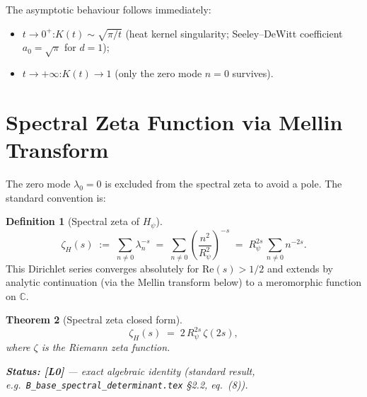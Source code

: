 \documentclass[11pt,a4paper]{article}
\newtheorem{theorem}{Theorem}[section]
\theoremstyle{definition}
\newtheorem{definition}[theorem]{Definition}
\theoremstyle{remark}
\newcommand{\Rp}{R_{\psi}}
\newcommand{\ZH}{\zeta_{H}(s)}
\newcommand{\Hp}{H_{\psi}}
\begin{document}
\medskip
The asymptotic behaviour follows immediately:
\begin{itemize}
  \item $t \to 0^+$:\quad $K(t) \sim \sqrt{\pi/t}$ (heat kernel singularity;
        Seeley--DeWitt coefficient $a_0 = \sqrt{\pi}$ for $d=1$);
  \item $t \to +\infty$:\quad $K(t) \to 1$ (only the zero mode $n=0$
        survives).
\end{itemize}

\section{Spectral Zeta Function via Mellin Transform}
\label{sec:mellin}

The zero mode $\lambda_0 = 0$ is excluded from the spectral zeta to
avoid a pole.  The standard convention is:

\begin{definition}[Spectral zeta of $\Hp$]\label{def:spec-zeta}
\begin{equation}\label{eq:spec-zeta-def}
  \ZH \;:=\; \sum_{n \neq 0} \lambda_n^{-s}
          \;=\; \sum_{n \neq 0} \left(\frac{n^2}{\Rp^2}\right)^{-s}
          \;=\; \Rp^{2s}\,\sum_{n \neq 0} n^{-2s}.
\end{equation}
This Dirichlet series converges absolutely for $\mathrm{Re}(s) > 1/2$
and extends by analytic continuation (via the Mellin transform below)
to a meromorphic function on $\mathbb{C}$.
\end{definition}

\begin{theorem}[Spectral zeta closed form]\label{thm:main}
\begin{equation}\label{eq:main}
  \boxed{\ZH \;=\; 2\,\Rp^{2s}\,\zeta(2s),}
\end{equation}
where $\zeta$ is the Riemann zeta function.

\textbf{Status: [L0]} — exact algebraic identity (standard result,
e.g.\ \texttt{B\_base\_spectral\_determinant.tex} §2.2, eq.~(8)).
\end{theorem}
\end{document}
